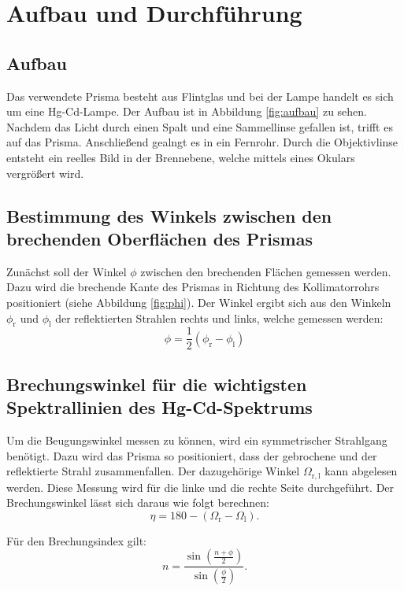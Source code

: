 \section {Aufbau und Durchführung}
\label{sec:durchführung}
\subsection{Aufbau}
Das verwendete Prisma besteht aus Flintglas und bei der Lampe handelt es sich um eine Hg-Cd-Lampe.
Der Aufbau ist in Abbildung \ref{fig:aufbau} zu sehen. Nachdem das Licht durch einen Spalt und eine Sammellinse gefallen ist, trifft es auf das Prisma. Anschließend gealngt es in ein Fernrohr. Durch die Objektivlinse entsteht ein reelles Bild in der Brennebene, welche mittels eines Okulars vergrößert wird.

\subsection{Bestimmung des Winkels zwischen den brechenden Oberflächen des Prismas}
Zunächst soll der Winkel $\phi$ zwischen den brechenden Flächen gemessen werden. Dazu wird die brechende Kante des Prismas in Richtung des Kollimatorrohrs positioniert (siehe Abbildung \ref{fig:phi}).
Der Winkel ergibt sich aus den Winkeln $\phi_\mathrm{r}$ und $\phi_\mathrm{l}$ der reflektierten Strahlen rechts und links, welche gemessen werden:
\begin{equation}
\label{eqn:winkel}
  \phi=\frac{1}{2}(\phi_\mathrm{r}-\phi_\mathrm{l})
\end{equation}

\subsection{Brechungswinkel für die wichtigsten Spektrallinien des Hg-Cd-Spektrums}
Um die Beugungswinkel messen zu können, wird ein symmetrischer Strahlgang benötigt. Dazu wird das Prisma so positioniert, dass der gebrochene und der reflektierte Strahl zusammenfallen. Der dazugehörige Winkel $\Omega_\mathrm{r,l}$ kann abgelesen werden. Diese Messung wird für die linke und die rechte Seite durchgeführt.
Der Brechungswinkel lässt sich daraus wie folgt berechnen:
\begin{equation}
  \label{eqn:eta}
  \eta = 180 - (\Omega_\mathrm{r}-\Omega_\mathrm{l}).
\end{equation}

Für den Brechungsindex gilt:
\begin{equation}
  \label{eqn:brechung}
  n= \frac{\sin\left(\frac{n+\phi}{2}\right)}{\sin\left(\frac{\phi}{2}\right)}.
\end{equation}
